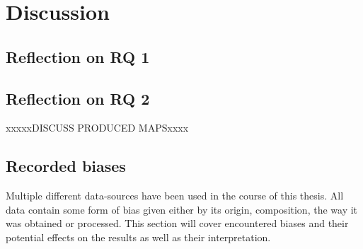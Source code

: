 \chapter{Discussion} \label{discussion}

\section{Reflection on RQ 1}


\section{Reflection on RQ 2}
xxxxxDISCUSS PRODUCED MAPSxxxx

\section{Recorded biases} \label{discussion_rec_bias}
Multiple different data-sources have been used in the course of this thesis. All data contain some form of bias given either by its origin, composition, the way it was obtained or processed. 
This section will cover encountered biases and their potential effects on the results as well as their interpretation.

